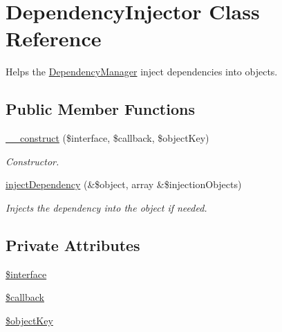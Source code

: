 \hypertarget{classDependencyInjector}{\section{Dependency\-Injector Class Reference}
\label{classDependencyInjector}
}


Helps the \hyperlink{classDependencyManager}{Dependency\-Manager} inject dependencies into objects.  


\subsection*{Public Member Functions}
\begin{DoxyCompactItemize}
\item 
\hyperlink{classDependencyInjector_aaf725667c8258b3d1ebdd412aac59e0e}{\-\_\-\-\_\-construct} (\$interface, \$callback, \$object\-Key)
\begin{DoxyCompactList}\small\item\em Constructor. \end{DoxyCompactList}\item 
\hyperlink{classDependencyInjector_a05fa48e4d3cd9ce03f8be591a78a90bf}{inject\-Dependency} (\&\$object, array \&\$injection\-Objects)
\begin{DoxyCompactList}\small\item\em Injects the dependency into the object if needed. \end{DoxyCompactList}\end{DoxyCompactItemize}
\subsection*{Private Attributes}
\begin{DoxyCompactItemize}
\item 
\hyperlink{classDependencyInjector_a08a02ea3c20bf5c0c4663295be333de9}{\$interface}
\item 
\hyperlink{classDependencyInjector_aab7e000c185ede09f6e9eb1e21ea3a0f}{\$callback}
\item 
\hyperlink{classDependencyInjector_afc1499f659e305063106b42975a69c76}{\$object\-Key}
\end{DoxyCompactItemize}


